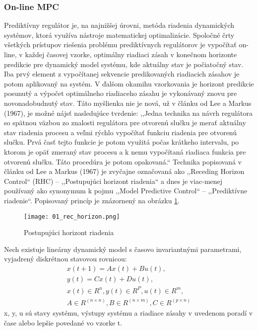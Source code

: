 \subsubsection{On-line MPC}
Prediktívny regulátor je, na najnižšej úrovni, metóda riadenia dynamických systémov, ktorá využíva nástroje matematickej optimalizácie. Spoločné črty všetkých prístupov riešenia problému prediktívnych regulátorov je vypočítať on-line, v každej časovej vzorke,  optimálny riadiaci zásah v konečnom horizonte predikcie pre dynamický model systému, kde aktuálny stav je počiatočný stav. Iba prvý element z vypočítanej sekvencie predikovaných riadiacich zásahov je potom aplikovaný na systém. V ďalšom okamihu vzorkovania je horizont predikcie posunutý a výpočet optimálneho riadiaceho zásahu je vykonávaný znovu pre novonadobudnutý stav. Táto myšlienka nie je nová, už v článku od Lee a Markus (1967), je možné nájsť nasledujúce tvrdenie: ,,Jedna technika na návrh regulátora so spätnou väzbou zo znalosti regulátora pre otvorenú slučku je merať aktuálny stav riadenia procesu a veľmi rýchlo vypočítať funkciu riadenia pre otvorenú slučku. Prvá časť tejto funkcie je potom využitá počas krátkeho intervalu, po ktorom je opäť zmeraný stav procesu a k nemu vypočítaná riadiaca funkcia pre otvorenú slučku. Táto procedúra je potom opakovaná.`` Technika popisovaná v článku od Lee a Markus (1967) je zvyčajne označovaná ako ,,Receding Horizon Control`` (RHC) – ,,Postupujúci horizont riadenia`` a dnes je viac-menej používaný ako synonymum k pojmu ,,Model Predictive Control`` – ,,Prediktívne riadenie``. \cite{MPC03} Popisovaný princíp je znázornený na obrázku \ref{01_rec_horizon}.
\begin{figure}[h]
\centering
\texttt{[image: 01\_rec\_horizon.png]}
\caption{Postupujúci horizont riadenia}
\label{01_rec_horizon}
\end{figure}
Nech existuje lineárny dynamický model s časovo invariantnými parametrami, vyjadrený diskrétnou stavovou rovnicou:
\begin{equation} \label{eq1}
\begin{split}
x(t+1)=Ax(t)+Bu(t), \\
y(t)=Cx(t)+Du(t), \\
x(t)∈R^n, y(t)∈R^P, u(t)∈R^m, \\
A∈R^{(n×n)}, B∈R^{(n×m)}, C∈R^{(p×n)}
\end{split}
\end{equation}
x, y, u sú stavy systému, výstupy systému a riadiace zásahy v uvedenom poradí v čase alebo lepšie povedané vo vzorke t. \\
